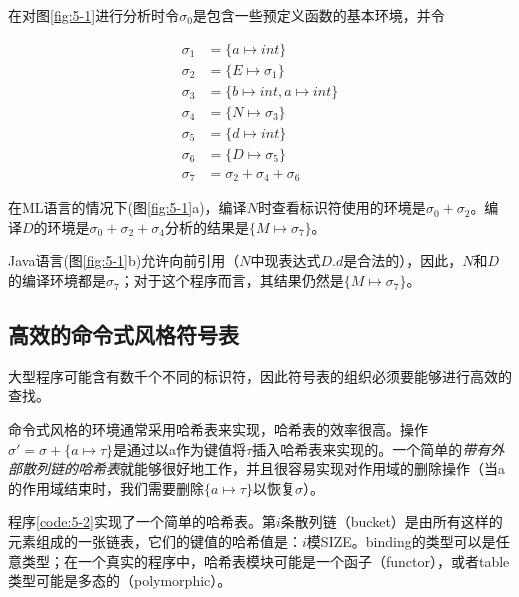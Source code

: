\documentclass[cn,11pt,chinese]{elegantbook}
\begin{document}
在对图\ref{fig:5-1}进行分析时令$\sigma_0$是包含一些预定义函数的基本环境，并令

\begin{align*}
  \sigma_1 &= \{a\mapsto int\} \\
  \sigma_2 &= \{E\mapsto \sigma_1\} \\
  \sigma_3 &= \{b\mapsto int,a\mapsto int\} \\
  \sigma_4 &= \{N\mapsto \sigma_3\} \\
  \sigma_5 &= \{d\mapsto int\} \\
  \sigma_6 &= \{D\mapsto \sigma_5\} \\
  \sigma_7 &= \sigma_2 + \sigma_4 + \sigma_6
\end{align*}

在ML语言的情况下(图\ref{fig:5-1}a)，编译$N$时查看标识符使用的环境是$\sigma_0+\sigma_2$。编译$D$的环境是$\sigma_0+\sigma_2+\sigma_4$分析的结果是$\{M\mapsto\sigma_7\}$。

Java语言(图\ref{fig:5-1}b)允许向前引用（$N$中现表达式$D.d$是合法的），因此，$N$和$D$的编译环境都是$\sigma_7$；对于这个程序而言，其结果仍然是$\{M\mapsto\sigma_7\}$。

\subsection{高效的命令式风格符号表}

大型程序可能含有数千个不同的标识符，因此符号表的组织必须要能够进行高效的查找。

命令式风格的环境通常采用哈希表来实现，哈希表的效率很高。操作$\sigma' = \sigma + \{a\mapsto \tau\}$是通过以a作为键值将$\tau$插入哈希表来实现的。一个简单的\textit{带有外部散列链的哈希表}就能够很好地工作，并且很容易实现对作用域的删除操作（当a的作用域结束时，我们需要删除$\{a\mapsto\tau\}$以恢复$\sigma$）。

程序\ref{code:5-2}实现了一个简单的哈希表。第$i$条散列链（bucket）是由所有这样的元素组成的一张链表，它们的键值的哈希值是：$i$模SIZE。binding的类型可以是任意类型；在一个真实的程序中，哈希表模块可能是一个函子（functor），或者table类型可能是多态的（polymorphic）。
\end{document}
